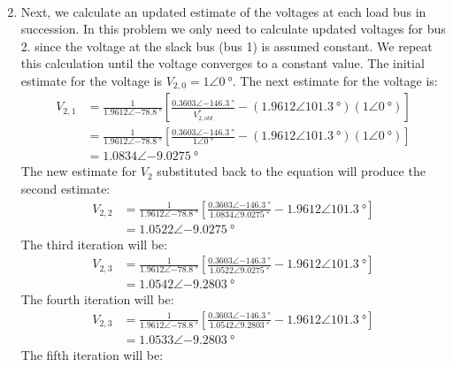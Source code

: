 \begin{enumerate}
\begin{align}
	      \end{align}
	\item Next, we calculate an updated estimate of the voltages at each load bus in succession. In this problem we only need to calculate updated voltages for bus 2. since the voltage at the slack bus (bus 1) is assumed constant. We repeat this calculation until the voltage converges to a constant value. The initial estimate for the voltage is $V_{2,0} = 1\angle\SI{0}{\degree}$. The next estimate for the voltage is:
	      \begin{align}
		      V_{2,1} & = \frac{1}{1.9612\angle\SI{-78.8}{\degree}}\left[\frac{0.3603\angle\SI{-146.3}{\degree}}{V^*_{2,old}}-\left(1.9612\angle\SI{101.3}{\degree}\right)\left(1\angle\SI{0}{\degree}\right)\right]            \\
		              & = \frac{1}{1.9612\angle\SI{-78.8}{\degree}}\left[\frac{0.3603\angle\SI{-146.3}{\degree}}{1\angle\SI{0}{\degree}}-\left(1.9612\angle\SI{101.3}{\degree}\right)\left(1\angle\SI{0}{\degree}\right)\right] \\
		              & = 1.0834\angle\SI{-9.0275}{\degree}
	      \end{align}
	      The new estimate for $V_2$ substituted back to the equation will produce the second estimate:
	      \begin{align}
		      V_{2,2} & = \frac{1}{1.9612\angle\SI{-78.8}{\degree}}\left[\frac{0.3603\angle\SI{-146.3}{\degree}}{1.0834\angle\SI{9.0275}{\degree}}-1.9612\angle\SI{101.3}{\degree}\right] \\
		              & = 1.0522\angle\SI{-9.0275}{\degree}
	      \end{align}
	      The third iteration will be:
	      \begin{align}
		      V_{2,3} & = \frac{1}{1.9612\angle\SI{-78.8}{\degree}}\left[\frac{0.3603\angle\SI{-146.3}{\degree}}{1.0522\angle\SI{9.0275}{\degree}}-1.9612\angle\SI{101.3}{\degree}\right] \\
		              & = 1.0542\angle\SI{-9.2803}{\degree}
	      \end{align}
	      The fourth iteration will be:
	      \begin{align}
		      V_{2,3} & = \frac{1}{1.9612\angle\SI{-78.8}{\degree}}\left[\frac{0.3603\angle\SI{-146.3}{\degree}}{1.0542\angle\SI{9.2803}{\degree}}-1.9612\angle\SI{101.3}{\degree}\right] \\
		              & = 1.0533\angle\SI{-9.2803}{\degree}
	      \end{align}
	      The fifth iteration will be:

\end{enumerate}
